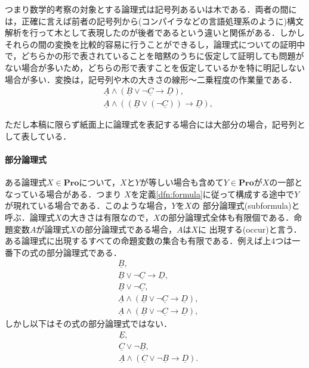 \documentclass{ltjsarticle}
\theoremstyle{mystyle1}
\theoremstyle{mystyle2}
\newcommand{\uA}{\underline{A}}
\newcommand{\uB}{\underline{B}}
\newcommand{\uC}{\underline{C}}
\newcommand{\uD}{\underline{D}}
\newcommand{\uE}{\underline{E}}
\newcommand{\bPro}{\ensuremath{\mathbf{Pro}}}
\newcommand{\red}[1]{{\color{red} #1}}
\begin{document}
つまり数学的考察の対象とする論理式は記号列あるいは木である．両者の間には，正確に言えば前者の記号列から(コンパイラなどの言語処理系のように)構文解析を行って木として表現したのが後者であるという違いと関係がある．しかしそれらの間の変換を比較的容易に行うことができるし，論理式についての証明中で，どちらかの形で表されていることを暗黙のうちに仮定して証明しても問題がない場合が多いため，どちらの形で表すことを仮定しているかを特に明記しない場合が多い．変換は，記号列や木の大きさの線形～二乗程度の作業量である．
\begin{align}
   & \uA\wedge\left(\uB\vee\neg\uC\to\uD\right),                           \\
   & \uA\wedge\left(\left(\uB\vee\left(\neg\uC\right)\right)\to\uD\right),
\end{align}
\begin{center}
\end{center}


ただし本稿に限らず紙面上に論理式を表記する場合には大部分の場合，記号列として表している．
\paragraph{部分論理式}
ある論理式$X\in \bPro$について，$X$と$Y$が等しい場合も含めて$Y\in\bPro$が$X$の一部となっている場合がある．つまり $X$を定義\ref{dfn:formula}に従って構成する途中で$Y$が現れている場合である．このような場合，$Y$を$X$の\red{部分論理式}(subformula)と呼ぶ．論理式$X$の大きさは有限なので，$X$の部分論理式全体も有限個である．命題変数$A$が論理式$X$の部分論理式である場合，$A$は$X$に\red{出現する}(occur)と言う．ある論理式に出現するすべての命題変数の集合も有限である．例えば上4つは一番下の式の部分論理式である．
\begin{align}
   & \uB,                                        \\
   & \uB\vee\neg\uC\to\uD,                       \\
   & \uB\vee\neg\uC,                             \\
   & \uA\wedge\left(\uB\vee\neg\uC\to\uD\right), \\
   & \uA\wedge\left(\uB\vee\neg\uC\to\uD\right),
\end{align}
しかし以下はその式の部分論理式ではない．
\begin{align}
   & \uE,                                        \\
   & \uC\vee\neg\uB,                             \\
   & \uA\wedge\left(\uC\vee\neg\uB\to\uD\right).
\end{align}
\end{document}
